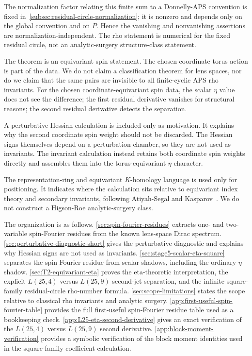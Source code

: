 \documentclass{article}
\theoremstyle{definition}
\numberwithin{equation}{section}
\begin{document}
The normalization factor relating this finite sum to a Donnelly-APS convention is fixed in~\autoref{subsec:residual-circle-normalization}; it is nonzero and depends only on the global convention and on $P$.  Hence the vanishing and nonvanishing assertions are normalization-independent.  The rho statement is numerical for the fixed residual circle, not an analytic-surgery structure-class statement.

The theorem is an equivariant spin statement.  The chosen coordinate torus action is part of the data.  We do not claim a classification theorem for lens spaces, nor do we claim that the same pairs are invisible to all finite-cyclic APS rho invariants.  For the chosen coordinate-equivariant spin data, the scalar $\eta$ value does not see the difference; the first residual derivative vanishes for structural reasons; the second residual derivative detects the separation.

A perturbative Hessian calculation is included only as motivation.  It explains why the second coordinate spin weight should not be discarded.  The Hessian signs themselves depend on a perturbation chamber, so they are not used as invariants.  The invariant calculation instead retains both coordinate spin weights directly and assembles them into the torus-equivariant $\eta$ character.

The representation-ring and equivariant $K$-homology language is used only for positioning.  It indicates where the calculation sits relative to equivariant index theory and secondary invariants, following Atiyah-Segal and Kasparov~\cite{AtiyahSegal,KasparovKK}.  We do not construct a Higson-Roe analytic-surgery class.


The organization is as follows.  \autoref{sec:spin-fourier-residues} extracts one- and two-variable spin-Fourier residues from the known lens-space Dirac spectrum.  \autoref{sec:perturbative-diagnostic-short} gives the perturbative diagnostic and explains why Hessian signs are not used as invariants.  \autoref{sec:stage5-scalar-eta-square} separates the spin-Fourier residue from scalar shadows, including the ordinary $\eta$ shadow.  \autoref{sec:T2-equivariant-eta} proves the eta-theoretic interpretation, the explicit $L(25,4)$ versus $L(25,9)$ second-jet separation, and the infinite square-family residual-circle rho-number formula.  \autoref{sec:scope-limitations} states the scope relative to classical rho invariants and analytic surgery. \autoref{app:first-useful-spin-fourier-table} provides the full first-useful spin-Fourier residue table used as a bookkeeping check.  \autoref{app:L25-eta-second-derivative} gives an exact verification of the $L(25,4)$ versus $L(25,9)$ second derivative. \autoref{app:block-moment-verification} provides a symbolic verification of the block moment identities used in the square-family coefficient calculation.
\end{document}
